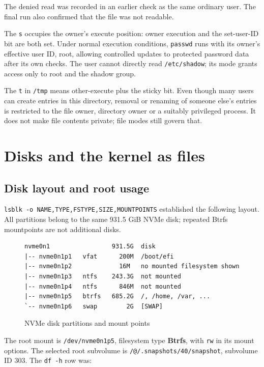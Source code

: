 \documentclass{../latex/utmreport}
\begin{document}
The denied read was recorded in an earlier check as the same ordinary user.
The final run also confirmed that the file was not readable.

The \texttt{s} occupies the owner's execute position: owner execution
and the set-user-ID bit are both set. Under normal execution conditions,
\texttt{passwd} runs with its owner's effective user ID, root, allowing
controlled updates to protected password data after its own checks. The
user cannot directly read \texttt{/etc/shadow}; its mode grants access
only to root and the shadow group.

The \texttt{t} in \texttt{/tmp} means other-execute plus the sticky bit.
Even though many users can create entries in this directory, removal or
renaming of someone else's entries is restricted to the file owner,
directory owner or a suitably privileged process. It does not make file
contents private; file modes still govern that.

\chapter{Disks and the kernel as
files}\label{disks-and-the-kernel-as-files}

\section{Disk layout and root usage}\label{disk-layout-and-root-usage}

\texttt{lsblk\ -o\ NAME,TYPE,FSTYPE,SIZE,MOUNTPOINTS} established the
following layout. All partitions belong to the same 931.5 GiB NVMe disk;
repeated Btrfs mountpoints are not additional disks.

\begin{figure}[H]
\begin{lstlisting}
nvme0n1                 931.5G  disk
|-- nvme0n1p1   vfat      200M  /boot/efi
|-- nvme0n1p2             16M   no mounted filesystem shown
|-- nvme0n1p3   ntfs    243.3G  not mounted
|-- nvme0n1p4   ntfs      846M  not mounted
|-- nvme0n1p5   btrfs   685.2G  /, /home, /var, ...
`-- nvme0n1p6   swap        2G  [SWAP]
\end{lstlisting}
\caption{NVMe disk partitions and mount points}
\end{figure}

The root mount is \texttt{/dev/nvme0n1p5}, filesystem type
\textbf{Btrfs}, with \texttt{rw} in its mount options. The selected root
subvolume is \texttt{/@/.snapshots/40/snapshot}, subvolume ID 303. The
\texttt{df\ -h} row was:
\end{document}
